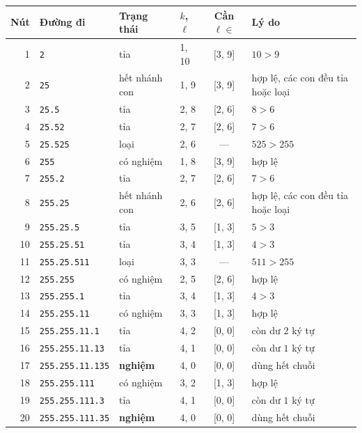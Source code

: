 \documentclass[12pt,a4paper]{article}
\begin{document}
\begin{table}[H]
\centering
\scriptsize
\begin{tabular}{@{}rlllcp{4.4cm}@{}}
\toprule
\textbf{Nút} & \textbf{Đường đi} & \textbf{Trạng thái} & $k$, $\ell$ & \textbf{Cần $\ell\in$} & \textbf{Lý do} \\
\midrule
1  & \texttt{2}                 & tỉa            & 1, 10 & [3, 9] & $10 > 9$ \\
2  & \texttt{25}                & hết nhánh con  & 1, 9  & [3, 9] & hợp lệ, các con đều tỉa hoặc loại \\
3  & \texttt{25.5}              & tỉa            & 2, 8  & [2, 6] & $8 > 6$ \\
4  & \texttt{25.52}             & tỉa            & 2, 7  & [2, 6] & $7 > 6$ \\
5  & \texttt{25.525}            & loại           & 2, 6  & ---    & $525 > 255$ \\
6  & \texttt{255}               & có nghiệm      & 1, 8  & [3, 9] & hợp lệ \\
7  & \texttt{255.2}             & tỉa            & 2, 7  & [2, 6] & $7 > 6$ \\
8  & \texttt{255.25}            & hết nhánh con  & 2, 6  & [2, 6] & hợp lệ, các con đều tỉa hoặc loại \\
9  & \texttt{255.25.5}          & tỉa            & 3, 5  & [1, 3] & $5 > 3$ \\
10 & \texttt{255.25.51}         & tỉa            & 3, 4  & [1, 3] & $4 > 3$ \\
11 & \texttt{255.25.511}        & loại           & 3, 3  & ---    & $511 > 255$ \\
12 & \texttt{255.255}           & có nghiệm      & 2, 5  & [2, 6] & hợp lệ \\
13 & \texttt{255.255.1}         & tỉa            & 3, 4  & [1, 3] & $4 > 3$ \\
14 & \texttt{255.255.11}        & có nghiệm      & 3, 3  & [1, 3] & hợp lệ \\
15 & \texttt{255.255.11.1}      & tỉa            & 4, 2  & [0, 0] & còn dư $2$ ký tự \\
16 & \texttt{255.255.11.13}     & tỉa            & 4, 1  & [0, 0] & còn dư $1$ ký tự \\
17 & \texttt{255.255.11.135}    & \textbf{nghiệm} & 4, 0 & [0, 0] & dùng hết chuỗi \\
18 & \texttt{255.255.111}       & có nghiệm      & 3, 2  & [1, 3] & hợp lệ \\
19 & \texttt{255.255.111.3}     & tỉa            & 4, 1  & [0, 0] & còn dư $1$ ký tự \\
20 & \texttt{255.255.111.35}    & \textbf{nghiệm} & 4, 0 & [0, 0] & dùng hết chuỗi \\
\bottomrule
\end{tabular}
\end{table}
\end{document}
